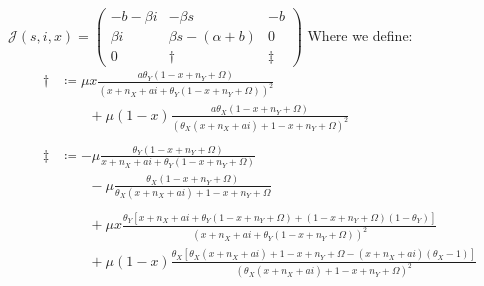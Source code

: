 $\mathcal{J}\left(s,i,x\right) = \begin{pmatrix}
	-b-\beta i & -\beta s & -b\\
	\beta i & \beta s - \left(\alpha + b\right) & 0\\
	0 & \dagger & \ddagger 
\end{pmatrix}$\newline\newline
Where we define:
\begin{align*}
	\dagger &\coloneqq \mu x \frac{a\theta_Y\left(1-x+n_Y+\Omega\right)}{\left(x+n_X + ai+\theta_Y\left(1-x+n_Y+\Omega\right)\right)^2}\\
		&\qquad + \mu \left(1-x\right)\frac{a\theta_X\left(1-x+n_Y + \Omega\right)}{\left(\theta_X\left(x+n_X+ai\right)+1-x+n_Y+\Omega\right)^2}\\
	&\\
	\ddagger & \coloneqq -\mu\frac{\theta_Y\left(1-x+n_Y+\Omega\right)}{x+n_X + ai+\theta_Y\left(1-x+n_Y+\Omega\right)}\\
		&\qquad - \mu\frac{\theta_X\left(1-x+n_Y + \Omega\right)}{\theta_X\left(x+n_X+ai\right)+1-x+n_Y+\Omega}\\
		&\\
		&\qquad + \mu x\frac{\theta_Y\left[x+n_X + ai + \theta_Y\left(1-x+n_Y+\Omega\right)+\left(1-x+n_Y+\Omega\right)\left(1-\theta_Y\right)\right]}{\left(x+n_X + ai + \theta_Y\left(1-x+n_Y+\Omega\right)\right)^2}\\
		&\qquad + \mu\left(1-x\right)\frac{\theta_X\left[\theta_X\left(x+n_X+ai\right)+1-x+n_Y+\Omega-\left(x+n_X+ai\right)\left(\theta_X-1\right)\right]}{\left(\theta_X\left(x+n_X+ai\right)+1-x+n_Y+\Omega\right)^2}
\end{align*}



